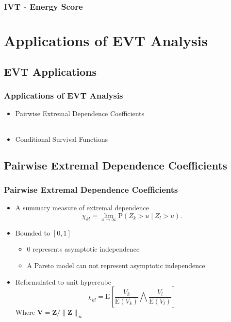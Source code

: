 \documentclass[aspectratio=169]{beamer}
\begin{document}
\begin{frame}
  \frametitle{IVT - Energy Score}
  \begin{center}
    
  \end{center}
\end{frame}

\section[EVT Applications]{Applications of EVT Analysis}
\subsection{EVT Applications}

\begin{frame}
  \frametitle{Applications of EVT Analysis}
  \begin{itemize}
    \item Pairwise Extremal Dependence Coefficients~\citep{warner2018}\\~\vspace{0.3cm}\\
    \item Conditional Survival Functions
  \end{itemize}
\end{frame}

\subsection{Pairwise Extremal Dependence Coefficients}

\begin{frame}
  \frametitle{Pairwise Extremal Dependence Coefficients}
  {\scriptsize\citep{warner2018}}
    \begin{itemize}
      \item A summary measure of extremal dependence
      \begin{equation*}
        \chi_{kl} = \lim\limits_{u\to\infty}\text{P}\left(Z_k > u\mid Z_l > u\right).
      \end{equation*}
      \pause
      \item Bounded to $[0,1]$
        \begin{itemize}
          \item $0$ represents asymptotic independence
          \item A Pareto model can not represent asymptotic independence
        \end{itemize}
      \pause
      \item Reformulated to unit hypercube
        \begin{equation*}
          \chi_{kl} = \text{E}\left[\frac{V_k}{\text{E}(V_k)}{\bigwedge}\frac{V_l}{\text{E}(V_l)}\right]
        \end{equation*}
        Where $\bm{V} = \bm{Z} / \lVert\bm{Z}\rVert_{\infty}$
    \end{itemize}
\end{frame}
\end{document}
